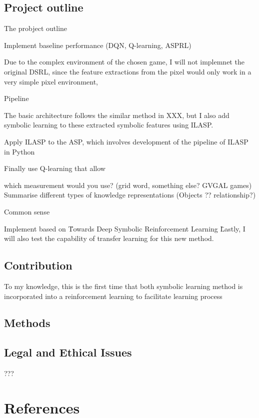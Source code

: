 \documentclass[12pt,twoside]{report}
\begin{document}
\section{Project outline}

The probject outline

Implement baseline performance (DQN, Q-learning, ASPRL)

Due to the complex environment of the chosen game, I will not implemnet the original DSRL, since the feature extractions from the pixel would only work in a very simple pixel environment,

Pipeline

The basic architecture follows the similar method in XXX, but I also add symbolic learning to these extracted symbolic features using ILASP.

Apply ILASP to the ASP, which involves development of the pipeline of ILASP in Python

Finally use Q-learning that allow

which measurement would you use? (grid word, something else? GVGAL games)
Summarise different types of knowledge representations (Objects ?? relationship?)

Common sense

Implement based on \"Towards Deep Symbolic Reinforcement Learning \"

Lastly, I will also test the capability of transfer learning for this new method.

\section{Contribution}

To my knowledge, this is the first time that both symbolic learning method is incorporated into a reinforcement learning to facilitate learning process

\section{Methods}

\section{Legal and Ethical Issues}

???




%
%

\chapter{References}


\end{document}
